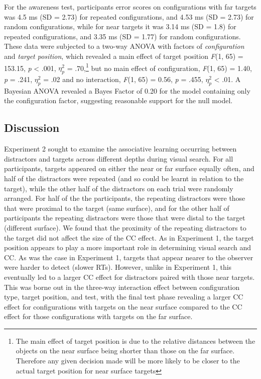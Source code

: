 \documentclass[
  english,
  man,floatsintext]{apa7}
\begin{document}
For the awareness test, participants error scores on configurations with far targets was 4.5 ms (SD = 2.73) for repeated configurations, and 4.53 ms (SD = 2.73) for random configurations, while for near targets it was 3.14 ms (SD = 1.8) for repeated configurations, and 3.35 ms (SD = 1.77) for random configurations. These data were subjected to a two-way ANOVA with factors of \emph{configuration} and \emph{target position}, which revealed a main effect of target position \emph{F}(1, 65) = 153.15, \emph{p} \textless{} .001, \(\eta^2_p\) = .70,\footnote{The main effect of target position is due to the relative distances between the objects on the near surface being shorter than those on the far surface. Therefore any given decision made will be more likely to be closer to the actual target position for near surface targets} but no main effect of configuration, \emph{F}(1, 65) = 1.40, \emph{p} = .241, \(\eta^2_p\) = .02 and no interaction, \emph{F}(1, 65) = 0.56, \emph{p} = .455, \(\eta^2_p\) \textless{} .01. A Bayesian ANOVA revealed a Bayes Factor of 0.20 for the model containing only the configuration factor, suggesting reasonable support for the null model.

\hypertarget{discussion-1}{%
\subsection{Discussion}\label{discussion-1}}

Experiment 2 sought to examine the associative learning occurring between distractors and targets across different depths during visual search. For all participants, targets appeared on either the near or far surface equally often, and half of the distractors were repeated (and so could be learnt in relation to the target), while the other half of the distractors on each trial were randomly arranged. For half of the the participants, the repeating distractors were those that were proximal to the target (same surface), and for the other half of participants the repeating distractors were those that were distal to the target (different surface). We found that the proximity of the repeating distractors to the target did not affect the size of the CC effect. As in Experiment 1, the target position appears to play a more important role in determining visual search and CC. As was the case in Experiment 1, targets that appear nearer to the observer were harder to detect (slower RTs). However, unlike in Experiment 1, this eventually led to a larger CC effect for distractors paired with those near targets. This was borne out in the three-way interaction effect between configuration type, target position, and test, with the final test phase revealing a larger CC effect for configurations with targets on the near surface compared to the CC effect for those configurations with targets on the far surface.
\end{document}

